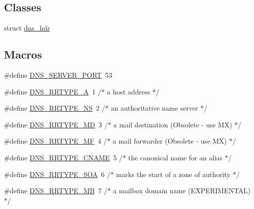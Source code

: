 \subsection*{Classes}
\begin{DoxyCompactItemize}
\item 
struct \hyperlink{structdns__hdr}{dns\+\_\+hdr}
\end{DoxyCompactItemize}
\subsection*{Macros}
\begin{DoxyCompactItemize}
\item 
\#define \hyperlink{openmote-cc2538_2lwip_2src_2include_2lwip_2prot_2dns_8h_a9266b48706648ecf0625a3e651095317}{D\+N\+S\+\_\+\+S\+E\+R\+V\+E\+R\+\_\+\+P\+O\+RT}~53
\item 
\#define \hyperlink{openmote-cc2538_2lwip_2src_2include_2lwip_2prot_2dns_8h_a830e99420463950d3c4d661487f20d0d}{D\+N\+S\+\_\+\+R\+R\+T\+Y\+P\+E\+\_\+A}~1     /$\ast$ a host address $\ast$/
\item 
\#define \hyperlink{openmote-cc2538_2lwip_2src_2include_2lwip_2prot_2dns_8h_acca8f4a2a1bea8615d892150ed890633}{D\+N\+S\+\_\+\+R\+R\+T\+Y\+P\+E\+\_\+\+NS}~2     /$\ast$ an authoritative name server $\ast$/
\item 
\#define \hyperlink{openmote-cc2538_2lwip_2src_2include_2lwip_2prot_2dns_8h_ae7d66bce2de34d6dbc3e4efc1a31e664}{D\+N\+S\+\_\+\+R\+R\+T\+Y\+P\+E\+\_\+\+MD}~3     /$\ast$ a mail destination (Obsolete -\/ use MX) $\ast$/
\item 
\#define \hyperlink{openmote-cc2538_2lwip_2src_2include_2lwip_2prot_2dns_8h_a3e88aee3ce8e0395e04b4248600e805d}{D\+N\+S\+\_\+\+R\+R\+T\+Y\+P\+E\+\_\+\+MF}~4     /$\ast$ a mail forwarder (Obsolete -\/ use MX) $\ast$/
\item 
\#define \hyperlink{openmote-cc2538_2lwip_2src_2include_2lwip_2prot_2dns_8h_a3dab0550bbdea0b4957461427d07be41}{D\+N\+S\+\_\+\+R\+R\+T\+Y\+P\+E\+\_\+\+C\+N\+A\+ME}~5     /$\ast$ the canonical name for an alias $\ast$/
\item 
\#define \hyperlink{openmote-cc2538_2lwip_2src_2include_2lwip_2prot_2dns_8h_aba0e1e44b7ad6b4096384d041111ee7a}{D\+N\+S\+\_\+\+R\+R\+T\+Y\+P\+E\+\_\+\+S\+OA}~6     /$\ast$ marks the start of a zone of authority $\ast$/
\item 
\#define \hyperlink{openmote-cc2538_2lwip_2src_2include_2lwip_2prot_2dns_8h_a70b5c47284dbde86c3563f20c6201962}{D\+N\+S\+\_\+\+R\+R\+T\+Y\+P\+E\+\_\+\+MB}~7     /$\ast$ a mailbox domain name (E\+X\+P\+E\+R\+I\+M\+E\+N\+T\+AL) $\ast$/

\end{DoxyCompactItemize}
